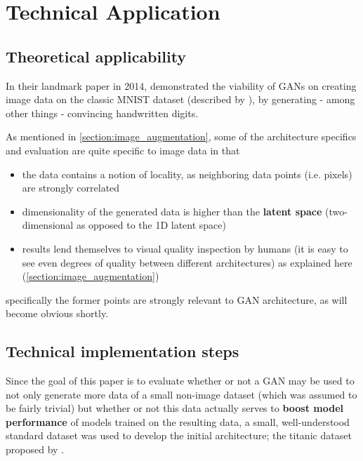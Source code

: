 \chapter{Technical Application}
\label{chapter:technical_application}

\section{Theoretical applicability}
\label{section:theory_application}

In their landmark paper in 2014, \cite{goodfellow2014generative} demonstrated the viability of \acp{GAN} on creating image data on the classic MNIST dataset (described by \cite{mnist}), by generating - among other things - convincing handwritten digits.

As mentioned in \ref{section:image_augmentation}, some of the architecture specifics and evaluation are quite specific to image data in that 

\begin{itemize}
	\item the data contains a notion of locality, as neighboring data points (i.e. pixels) are strongly correlated
	\item dimensionality of the generated data is higher than the \textbf{latent space} (two-dimensional as opposed to the 1D latent space)
	\item results lend themselves to visual quality inspection by humans (it is easy to see even degrees of quality between different architectures) as explained here (\ref{section:image_augmentation})
\end{itemize}

specifically the former points are strongly relevant to \ac{GAN} architecture, as will become obvious shortly.

\section{Technical implementation steps}
\label{section:technical_implementation}

Since the goal of this paper is to evaluate whether or not a \ac{GAN} may be used to not only generate more data of a small non-image dataset (which was assumed to be fairly trivial) but whether or not this data actually serves to \textbf{boost model performance} of models trained on the resulting data, a small, well-understood standard dataset was used to develop the initial architecture; the titanic dataset proposed by \cite{titanic}.

